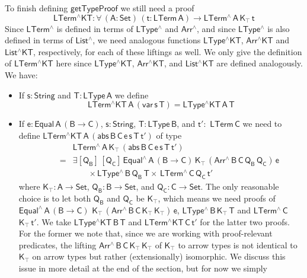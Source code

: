 \documentclass[sigplan,screen]{acmart}
\begin{document}
To finish defining $\mathsf{getTypeProof}$ we still need a proof
\[ \mathsf{LTerm^\wedge KT : \forall\, (A : Set)\, (t : LTerm\, A) \to
  LTerm^{\wedge}\, A\, K_\top\,t} \] Since $\mathsf{LTerm^\wedge}$ is
defined in terms of $\mathsf{LType^\wedge}$ and $\mathsf{Arr^\wedge}$,
and since $\mathsf{LType^\wedge}$ is also defined in terms of
$\mathsf{List^\wedge}$, we need analogous functions
$\mathsf{LType^\wedge KT}$, $\mathsf{Arr^\wedge KT}$ and
$\mathsf{List^\wedge KT}$, respectively, for each of these liftings as
well.  We only give the definition of $\mathsf{LTerm^\wedge KT}$ here
since $\mathsf{LType^\wedge KT}$, $\mathsf{Arr^\wedge KT}$, and
$\mathsf{List^\wedge KT}$ are defined analogously. We have:
\begin{itemize}
\item If $\mathsf{s : String}$ and $\mathsf{T : LType\,A}$ we define
  \[\mathsf{LTerm^\wedge KT\,A\,(var\,s\,T)} = \mathsf{LType^\wedge
  KT\,A\,T}\]
\item If $\mathsf{e : Equal\,A\,(B \to C)}$, $\mathsf{s : String}$,
  $\mathsf{T : LType\,B}$, and $\mathsf{t' :}$ $\mathsf{LTerm\,C}$ we
  need to define $\mathsf{LTerm^\wedge KT\,A\, (abs\, B \,C \, e \,s
    \,T \, t')}$ of type
\[\begin{array}{ll}
 & \!\!\mathsf{LTerm^{\wedge}\,A\,K_\top\, (abs \,B \,C \,e \,s \,T
  \,t')}\\
\quad\quad = & \!\!\mathsf{\exists [Q_B]\, [Q_C]\, Equal^{\wedge} \, A\, (B \to
  C)\, K_\top\, (Arr^{\wedge} \, B\, C\, Q_B \, Q_C)\, e }\\
 & \quad\quad\mathsf{\times \, LType^{\wedge}\, B\, Q_B\, T \times \,
  LTerm^{\wedge}\, C\, Q_C\,t' }
\end{array}\]
where $\mathsf{K_\top : A \to Set}$, $\mathsf{Q_B : B \to Set}$, and
$\mathsf{Q_C : C \to Set}$.  The only reasonable choice is to let both
$\mathsf{Q_B}$ and $\mathsf{Q_C}$ be $\mathsf{K_\top}$, which means we
need proofs of
$\mathsf{Equal^{\wedge} \, A\, (B \to C)}$ $\mathsf{K_\top\,
  (Arr^{\wedge} \, B\, C\, K_\top \, K_\top)\, e}$,
$\mathsf{LType^{\wedge}\, B\, K_\top\, T}$ and
$\mathsf{LTerm^{\wedge}\, C}$ $\mathsf{K_\top\, t'}$.  We take
$\mathsf{LType^\wedge KT\, B\, T}$ and $\mathsf{LTerm^\wedge KT\, C\,
  t'}$ for the latter two proofs. For the former we note that, since
we are working with proof-relevant predicates, the lifting
$\mathsf{Arr^{\wedge} \, B\, C\, K_\top \, K_\top}$ of
$\mathsf{K_\top}$ to arrow types is not identical to $\mathsf{K_\top}$
on arrow types but rather (extensionally) isomorphic.  We discuss this
issue in more detail at the end of the section, but for now we simply

\end{itemize}
\end{document}
